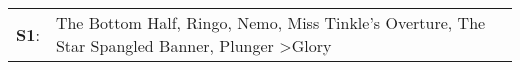 \begin{supertabular}{p{0.03\textwidth}p{0.92\textwidth}}
 \textbf{S1}:  &  The Bottom Half\textsuperscript{}, \enspace Ringo\textsuperscript{}, \enspace Nemo\textsuperscript{}, \enspace Miss Tinkle's Overture\textsuperscript{}, \enspace The Star Spangled Banner\textsuperscript{}, \enspace Plunger\textsuperscript{} \textgreater \enspace Glory\textsuperscript{}  \enspace  \\
\end{supertabular}
